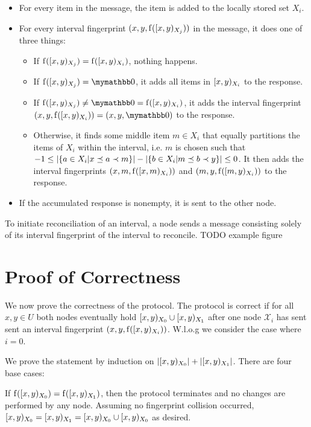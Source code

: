 \begin{itemize}
  \item For every item in the message, the item is added to the locally stored set $X_i$.
  \item For every interval fingerprint $({x}, {y}, {\operatorname{f}([{x},{y})_{X_j})})$ in the message, it does one of three things:
  \begin{itemize}
    \item If $\operatorname{f}([{x},{y})_{X_j}) = \operatorname{f}([{x},{y})_{X_i})$, nothing happens.
    \item If $\fp{\interval{x}{y}{X_j}} = \neutraladd$, it adds all items in $[{x},{y})_{X_i}$ to the response.
    \item If $\fp{\interval{x}{y}{X_j}} \neq \neutraladd = \fp{\interval{x}{y}{X_i}}$, it adds the interval fingerprint $\ifp{x}{y}{X_i} = \ifpmanual{x}{y}{\neutraladd}$ to the response.
    \item Otherwise, it finds some middle item $m \in X_i$ that equally partitions the items of $X_i$ within the interval, i.e. $m$ is chosen such that $-1 \leq |{\{a \in X_i | x \preceq a \prec m\}}| - |{\{b \in X_i | m \preceq b \prec y\}}| \leq 0$. It then adds the interval fingerprints $({x}, {m}, {\operatorname{f}([{x},{m})_{X_i})})$ and $({m}, {y}, {\operatorname{f}([{m},{y})_{X_i})})$ to the response.
  \end{itemize}
  \item If the accumulated response is nonempty, it is sent to the other node.
\end{itemize}

To initiate reconciliation of an interval, a node sends a message consisting solely of its interval fingerprint of the interval to reconcile. TODO example figure

\section{Proof of Correctness}
\label{set-reconciliation-simple-correct}

We now prove the correctness of the protocol. The protocol is correct if for all $x, y \in U$ both nodes eventually hold $[{x},{y})_{X_0} \cup [{x},{y})_{X_1}$ after one node $\mathcal{X}_i$ has sent sent an interval fingerprint $({x}, {y}, {\operatorname{f}([{x},{y})_{X_i})})$. W.l.o.g we consider the case where $i = 0$.

We prove the statement by induction on $|{[{x},{y})_{X_0}}| + |{[{x},{y})_{X_1}}|$. There are four base cases:

If $\operatorname{f}([{x},{y})_{X_0}) = \operatorname{f}([{x},{y})_{X_1})$, then the protocol terminates and no changes are performed by any node. Assuming no fingerprint collision occurred, $[{x},{y})_{X_0} = [{x},{y})_{X_1} = [{x},{y})_{X_0} \cup [{x},{y})_{X_0}$ as desired.

